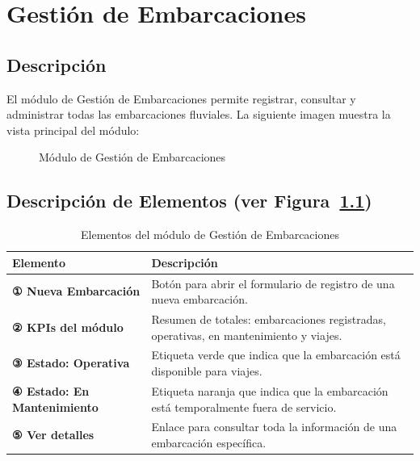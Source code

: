 \documentclass[12pt,a4paper]{report}
\begin{document}
\chapter{Gestión de Embarcaciones}

\section{Descripción}

El módulo de Gestión de Embarcaciones permite registrar, consultar y administrar todas las embarcaciones fluviales. La siguiente imagen muestra la vista principal del módulo:

\begin{figure}[H]
  \centering
  \fbox{\rule{0pt}{4cm}\hspace{10cm}}
  \caption{Módulo de Gestión de Embarcaciones}
  \label{fig:embarcaciones}
\end{figure}

\section{Descripción de Elementos (ver Figura~\ref{fig:embarcaciones})}

\begin{table}[H]
  \centering
  \renewcommand{\arraystretch}{1.4}
  \begin{tabularx}{\textwidth}{@{}L{5cm} X@{}}
    \toprule
    \textbf{Elemento} & \textbf{Descripción} \\
    \midrule
    \textbf{① Nueva Embarcación} & Botón para abrir el formulario de registro de una nueva embarcación. \\
    \textbf{② KPIs del módulo} & Resumen de totales: embarcaciones registradas, operativas, en mantenimiento y viajes. \\
    \textbf{③ Estado: Operativa} & Etiqueta verde que indica que la embarcación está disponible para viajes. \\
    \textbf{④ Estado: En Mantenimiento} & Etiqueta naranja que indica que la embarcación está temporalmente fuera de servicio. \\
    \textbf{⑤ Ver detalles} & Enlace para consultar toda la información de una embarcación específica. \\
    \bottomrule
  \end{tabularx}
  \caption{Elementos del módulo de Gestión de Embarcaciones}
\end{table}
\end{document}
